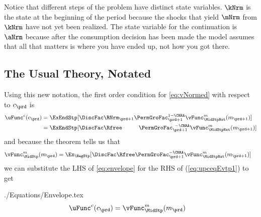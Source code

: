 \documentclass[\econtexRoot/SolvingMicroDSOPs]{subfiles}
\begin{document}
Notice that different steps of the problem have distinct state variables.  $\kNrm$ is the state at the beginning of the period because the shocks that yield $\mNrm$ from $\kNrm$ have not yet been realized. The state variable for the continuation {\move} is $\aNrm$ because after the consumption decision has been made the model assumes that all that matters is where you have ended up, not how you got there.

\subsection{The Usual Theory, Notated}

Using this new notation, the first order condition for \eqref{eq:vNormed} with respect to ${c}_{\prd}$ is
\begin{equation}\begin{gathered}\begin{aligned}
      \uFunc^{{c}}({c}_{\prd})  & = \ExEndStp[\DiscFac \RNrm_{\prd+1}\PermGroFac_{\prd+1}^{1-\CRRA}{\vFunc}^{{m}}_{\MidStpNxt}({m}_{\prd+1})]  \label{eq:upceqEvtp1}
      \\                        & =  \ExEndStp[\DiscFac\Rfree\phantom{._{\prd+1}}\PermGroFac_{\prd+1}^{\phantom{1}-\CRRA}{\vFunc}^{{m}}_{\MidStpNxt}({m}_{\prd+1})]
    \end{aligned}\end{gathered}\end{equation}
and because the  theorem tells us that
\begin{equation}\begin{gathered}\begin{aligned}
      {\vFunc}^{{m}}_{\MidStp}({m}_{\prd})  & =  \Ex_{\BegStp} [\DiscFac\Rfree\PermGroFac_{\prd+1}^{-\CRRA}{\vFunc}^{{m}}_{\MidStpNxt}({m}_{\prd+1})] \label{eq:envelope}
    \end{aligned}\end{gathered}\end{equation}
we can substitute the LHS of \eqref{eq:envelope} for the RHS of
(\ref{eq:upceqEvtp1}) to get
\begin{verbatimwrite}{./Equations/Envelope.tex}
  \begin{equation}\begin{gathered}\begin{aligned}
        \uFunc^{{c}}({c}_{\prd})  & = {\vFunc}^{{m}}_{\MidStp}({m}_{\prd})\label{eq:upcteqvtp}
      \end{aligned}\end{gathered}\end{equation}
\end{verbatimwrite}
\end{document}
